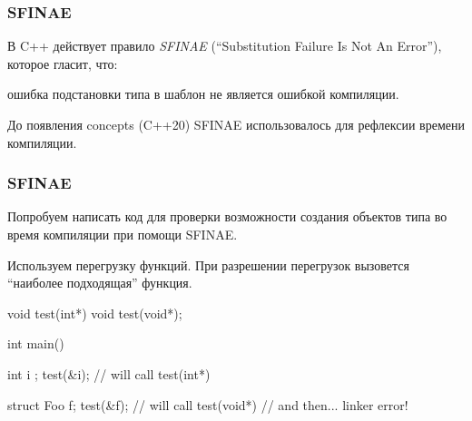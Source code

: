 \documentclass[compress, 8pt, aspectratio=169]{beamer}
\begin{document}
  \begin{frame}[fragile]

    \frametitle{SFINAE}

    В C++ действует правило \textit{SFINAE}\footnotemark{}
    (\enquote{Substitution Failure Is Not An Error}), которое гласит, что:


    \begin{tcolorbox}
      ошибка подстановки типа в шаблон не является ошибкой
      компиляции\footnotemark{}.
    \end{tcolorbox}


    До появления concepts (C++20) SFINAE использовалось для рефлексии\footnotemark{}
    времени компиляции.


  \end{frame}

  \begin{frame}[fragile]

    \frametitle{SFINAE}

    Попробуем написать код для проверки возможности создания объектов типа
    во время компиляции при помощи SFINAE.

    Используем перегрузку функций.
    При разрешении перегрузок вызовется \enquote{наиболее подходящая}
    функция.

    \begin{myinplacelisting}[minted language=cpp]
void test(int*) {}
void test(void*);

int main() {
    int i {};
    test(&i); // will call test(int*)

    struct Foo {} f;
    test(&f); // will call test(void*)
              // and then... linker error!
}
    \end{myinplacelisting}

  \end{frame}
\end{document}
